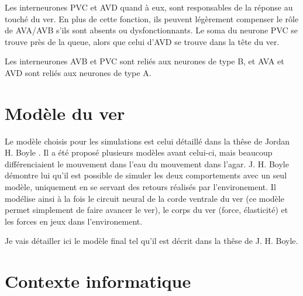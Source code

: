 Les interneurones PVC et AVD quand à eux, sont responsables de la réponse au
touché du ver. En plus de cette fonction, ils peuvent légèrement compenser le
rôle de AVA/AVB s'ils sont absents ou dysfonctionnants. 
Le soma du neurone PVC se
trouve près de la queue, alors que celui d'AVD se trouve dans la tête du ver.

Les interneurones AVB et PVC sont reliés aux neurones de type B, et
AVA et AVD sont reliés aux neurones de type A.




\section{Modèle du ver} %
\label{sec:Modèle du ver}

Le modèle choisis pour les simulations est celui détaillé dans la thêse de
Jordan H. Boyle \cite{Boyle2009}. Il a été proposé plusieurs modèles avant
celui-ci, mais beaucoup différenciaient le mouvement dans l'eau du mouvement
dans l'agar. J. H. Boyle démontre lui qu'il est
possible de simuler les deux comportements avec un seul modèle, uniquement
en se servant des retours réalisés par l'environement. Il modélise ainsi à la
fois le circuit neural de la corde ventrale du ver (ce modèle permet simplement
de faire avancer le ver), le corps du ver (force, élasticité) et les forces
en jeux dans l'environement.

Je vais détailler ici le modèle final tel qu'il est décrit dans la thêse de J. H. Boyle.


\section{Contexte informatique} %
\label{sec:Contexte informatique}


